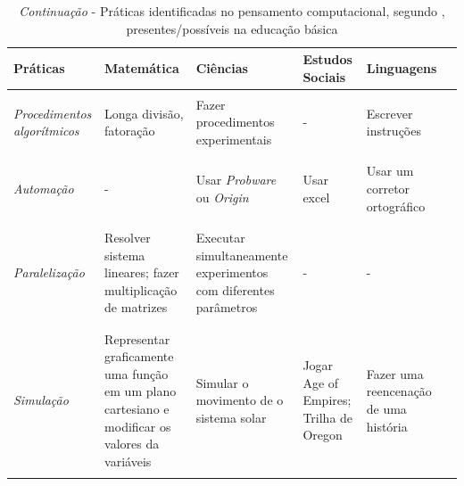 \begin{table}[!htb]
  \caption{\textit{Continuação} - Práticas identificadas no pensamento computacional, segundo , presentes/possíveis na educação básica}
  \label{tab:facetas}
  \begin{center}
    \begin{tabularx}{\textwidth}{@{}YYYYYY@{}}
      \hline 
      
      \textbf{Práticas} & \textbf{Matemática} & \textbf{Ciências} & \textbf{Estudos Sociais} & \textbf{Linguagens} \\

      \hline
      \\
      \textit{Procedimentos algorítmicos} & Longa divisão, fatoração & Fazer procedimentos experimentais & - & Escrever instruções \\ \\ %

      \hline
      \\
      \textit{Automação} & - & Usar \textit{Probware} ou \textit{Origin} & Usar excel & Usar um corretor ortográfico \\ \\ 

      \hline
      \\
      \textit{Paralelização} & Resolver sistema lineares; fazer multiplicação de matrizes & Executar simultaneamente experimentos com diferentes parâmetros & - & - \\ \\

      \hline
      \\
      \textit{Simulação} & Representar graficamente uma função em um plano cartesiano e modificar os valores da variáveis & Simular o movimento de o sistema solar & Jogar Age of Empires; Trilha de Oregon & Fazer uma reencenação de uma história \\ \\
      \hline

    \end{tabularx}
  \end{center}
\end{table}


